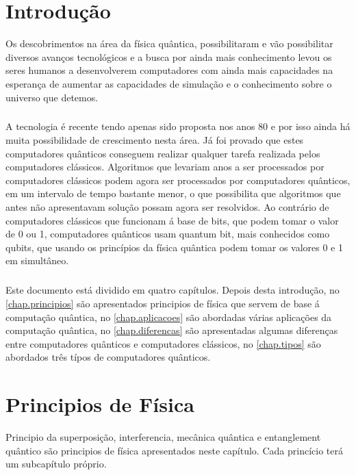 \documentclass{report}
\begin{document}
\clearpage
{}

\chapter{Introdução}
\label{chap.introducao}
Os descobrimentos na área da física quântica, possibilitaram e vão possibilitar diversos avanços tecnológicos e a busca por ainda mais conhecimento levou os seres humanos a desenvolverem computadores com ainda mais capacidades na esperança de aumentar as capacidades de simulação e o conhecimento sobre o universo que detemos.
 \paragraph{}A tecnologia é recente tendo apenas sido proposta nos anos 80 e por isso ainda há muita possibilidade de crescimento nesta área. Já foi provado que estes computadores quânticos conseguem realizar qualquer tarefa realizada pelos computadores clássicos. Algoritmos que levariam anos a ser processados por computadores clássicos podem agora ser processados por computadores quânticos, em um intervalo de tempo bastante menor, o que possibilita que algoritmos que antes não apresentavam solução possam agora ser resolvidos. Ao contrário de computadores clássicos que funcionam á base de bits, que podem tomar o valor de 0 ou 1, computadores quânticos usam quantum bit, mais conhecidos como qubits, que usando os princípios da física quântica podem tomar os valores 0 e 1 em simultâneo.
\paragraph{}Este documento está dividido em quatro capítulos.
Depois desta introdução,
no \autoref{chap.principios} são apresentados principios de física que servem de base á computação quântica,
no \autoref{chap.aplicacoes} são abordadas várias aplicações da computação quântica,
no \autoref{chap.diferencas} são apresentadas algumas diferenças entre computadores quânticos e computadores clássicos,
no \autoref{chap.tipos} são abordados três típos de computadores quânticos.


\chapter{Principios de Física}
\label{chap.principios}
Principio da superposição, interferencia, mecânica quântica e entanglement quântico são principios de física apresentados neste capítulo. Cada princício terá
um subcapítulo próprio.
\end{document}
